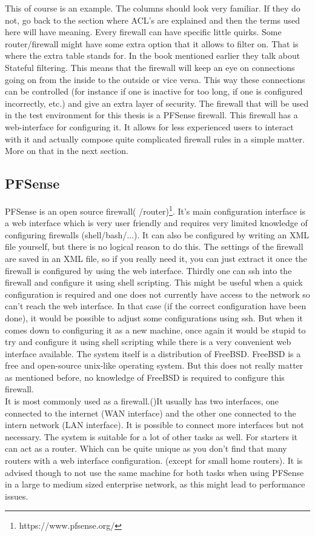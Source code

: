 This of course is an example. The columns should look very familiar. If they do not, go back to the section where ACL's are explained and then the terms used here will have meaning.
Every firewall can have specific little quirks. Some router/firewall might have some extra option that it allows to filter on. That is where the extra table stands for. In the book mentioned earlier they talk about Stateful filtering. This means that the firewall will keep an eye on connections going on from the inside to the outside or vice versa. This way these connections can be controlled (for instance if one is inactive for too long, if one is configured incorrectly, etc.) and give an extra layer of security. The firewall that will be used in the test environment for this thesis is a PFSense firewall. This firewall has a web-interface for configuring it. It allows for less experienced users to interact with it and actually compose quite complicated firewall rules in a simple matter. More on that in the next section.
\subsection{PFSense}
PFSense is an open source firewall( /router)\footnote{https://www.pfsense.org/}. It's main configuration interface is a web interface which is very user friendly and requires very limited knowledge of configuring firewalls (shell/bash/...). It can also be configured by writing an XML file yourself, but there is no logical reason to do this. The settings of the firewall are saved in an XML file, so if you really need it, you can just extract it once the firewall is configured by using the web interface. Thirdly one can ssh into the firewall and configure it using shell scripting. This might be useful when a quick configuration is required and one does not currently have access to the network so can't reach the web interface. In that case (if the correct configuration have been done), it would be possible to adjust some configurations using ssh. But when it comes down to configuring it as a new machine, once again it would be stupid to try and configure it using shell scripting while there is a very convenient web interface available.
The system itself is a distribution of FreeBSD. FreeBSD is a free and open-source unix-like operating system. But this does not really matter as mentioned before, no knowledge of FreeBSD is required to configure this firewall.\\
It is most commonly used as a firewall.(\textcite{pfSenseGuide})It usually has two interfaces, one connected to the internet (WAN interface) and the other one connected to the intern network (LAN interface). It is possible to connect more interfaces but not necessary. The system is suitable for a lot of other tasks as well. For starters it can act as a router. Which can be quite unique as you don't find that many routers with a web interface configuration. (except for small home routers). It is advised though to not use the same machine for both tasks when using PFSense in a large to medium sized enterprise network, as this might lead to performance issues.\\

